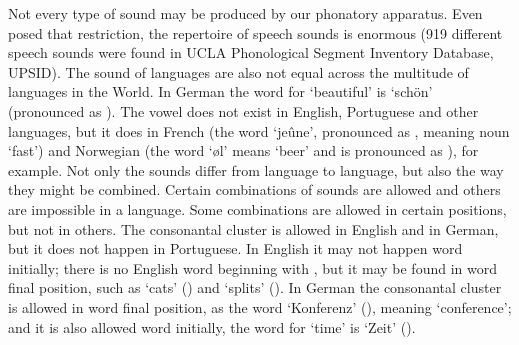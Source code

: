 Not every type of sound may be produced by our phonatory apparatus. Even posed that restriction, the repertoire of speech sounds is enormous (919 different speech sounds were found in UCLA Phonological Segment Inventory Database, UPSID). The sound of languages are also not equal across the multitude of languages in the World. In German the word for `beautiful' is `schön' (pronounced as \textipa{[S\o:n]}). The vowel \textipa{[\o]} does not exist in English, Portuguese and other languages, but it does in French (the word `jeûne', pronounced as \textipa{[Z\o n]}, meaning noun `fast') and Norwegian (the word `\o l' means `beer' and is pronounced as \textipa{[\o l]}), for example. Not only the sounds differ from language to language, but also the way they might be combined. Certain combinations of sounds are allowed and others are impossible in a language. Some combinations are allowed in certain positions, but not in others. The consonantal cluster \textipa{[ts]} is allowed in English and in German, but it does not happen in Portuguese. In English it may not happen word initially; there is no English word beginning with \textipa{[ts]}, but it may be found in word final position, such as `cats' (\textipa{[k\ae ts]}) and `splits' (\textipa{[splits]}). In German the consonantal cluster is allowed in word final position, as the word `Konferenz' (), meaning `conference'; and it is also allowed word initially, the word for `time' is `Zeit' (\textipa{[tsaIt]}).

